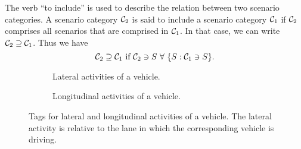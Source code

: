 %	

The verb ``to include'' is used to describe the relation between two scenario categories. A scenario category $\mathcal{C}_{2}$ is said to include a scenario category $\mathcal{C}_{1}$ if $\mathcal{C}_{2}$ comprises all scenarios that are comprised in $\mathcal{C}_{1}$. In that case, we can write $\mathcal{C}_{2} \supseteq \mathcal{C}_{1}$. Thus we have
\begin{equation} \label{eq:scenario category include}
	\scenariocategoryb \includes \scenariocategorya \text{ if } \scenariocategoryb \comprises \scenario\,\,\forall\,\, \{S: \scenariocategorya \comprises \scenario\}.
\end{equation}

\begin{figure*}[t]
	\centering
	\begin{subfigure}{\linewidth}
		\centering
		\caption{Lateral activities of a vehicle.\vspace{1em}}
		\label{fig:tree vehicle lat act}
	\end{subfigure}
	\begin{subfigure}{\linewidth}
		\centering
		\caption{Longitudinal activities of a vehicle.}
		\label{fig:tree vehicle long act}
	\end{subfigure}
	\caption{Tags for lateral and longitudinal activities of a vehicle. The lateral activity is relative to the lane in which the corresponding vehicle is driving.}
	\label{fig:tree vehicle activities}
\end{figure*}

